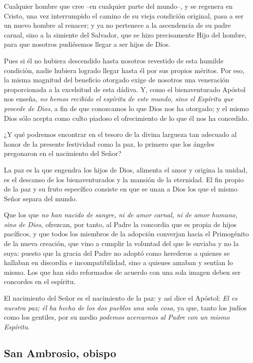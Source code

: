 \begin{body}
\begin{body}
Cualquier hombre que cree --en cualquier parte del mundo--, y se regenera en Cristo, una vez interrumpido el camino de su vieja condición original, pasa a ser un nuevo hombre al renacer; y ya no pertenece a la ascendencia de su padre carnal, sino a la simiente del Salvador, que se hizo precisamente Hijo del hombre, para que nosotros pudiésemos llegar a ser hijos de Dios.

Pues si él no hubiera descendido hasta nosotros revestido de esta humilde condición, nadie hubiera logrado llegar hasta él por sus propios méritos. Por eso, la misma magnitud del beneficio otorgado exige de nosotros una veneración proporcionada a la excelsitud de esta dádiva. Y, como el bienaventurado Apóstol nos enseña, \emph{no hemos recibido el espíritu de este mundo, sino el Espíritu que procede de Dios}, a fin de que conozcamos lo que Dios nos ha otorgado; y el mismo Dios sólo acepta como culto piadoso el ofrecimiento de lo que él nos ha concedido.

¿Y qué podremos encontrar en el tesoro de la divina largueza tan adecuado al honor de la presente festividad como la paz, lo primero que los ángeles pregonaron en el nacimiento del Señor?

La paz es la que engendra los hijos de Dios, alimenta el amor y origina la unidad, es el descanso de los bienaventurados y la mansión de la eternidad. El fin propio de la paz y su fruto específico consiste en que se unan a Dios los que el mismo Señor separa del mundo.

Que los que \emph{no han nacido de sangre, ni de amor carnal, ni de amor humano, sino de Dios,} ofrezcan, por tanto, al Padre la concordia que es propia de hijos pacíficos, y que todos los miembros de la adopción converjan hacia el Primogénito de la nueva creación, que vino a cumplir la voluntad del que le enviaba y no la suya: puesto que la gracia del Padre no adoptó como herederos a quienes se hallaban en discordia e incompatibilidad, sino a quienes amaban y sentían lo mismo. Los que han sido reformados de acuerdo con una sola imagen deben ser concordes en el espíritu.

El nacimiento del Señor es el nacimiento de la paz: y así dice el Apóstol: \emph{El es nuestra paz; él ha hecho de los dos pueblos una sola cosa,} ya que, tanto los judíos como los gentiles, por su medio \emph{podemos acercarnos al Padre con un mismo Espíritu}.

\subsection{San Ambrosio, obispo}


\end{body}
\end{body}
